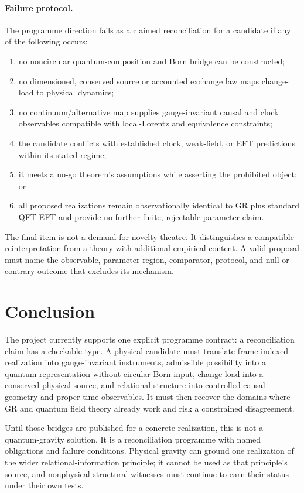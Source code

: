 \documentclass[11pt,a4paper]{article}
\theoremstyle{remark}
\begin{document}
\paragraph{Failure protocol.} The programme direction fails as a claimed
reconciliation for a candidate if any of the following occurs:
\begin{enumerate}[leftmargin=*]
\item no noncircular quantum-composition and Born bridge can be constructed;
\item no dimensioned, conserved source or accounted exchange law maps
change-load to physical dynamics;
\item no continuum/alternative map supplies gauge-invariant causal and clock
observables compatible with local-Lorentz and equivalence constraints;
\item the candidate conflicts with established clock, weak-field, or EFT
predictions within its stated regime;
\item it meets a no-go theorem's assumptions while asserting the prohibited
object; or
\item all proposed realizations remain observationally identical to GR plus
standard QFT EFT and provide no further finite, rejectable parameter claim.
\end{enumerate}
The final item is not a demand for novelty theatre. It distinguishes a compatible
reinterpretation from a theory with additional empirical content. A valid
proposal must name the observable, parameter region, comparator, protocol, and
null or contrary outcome that excludes its mechanism.

\section{Conclusion}\label{sec:conclusion}
The project currently supports one explicit programme contract: a reconciliation claim has a
checkable type. A physical candidate must translate frame-indexed realization
into gauge-invariant instruments, admissible possibility into a quantum
representation without circular Born input, change-load into a conserved
physical source, and relational structure into controlled causal geometry and
proper-time observables. It must then recover the domains where GR and quantum
field theory already work and risk a constrained disagreement.

Until those bridges are published for a concrete realization, this is not a
quantum-gravity solution. It is a reconciliation programme with named
obligations and failure conditions. Physical gravity can ground one realization
of the wider relational-information principle; it cannot be used as that
principle's source, and nonphysical structural witnesses must continue to earn
their status under their own tests.
\end{document}
